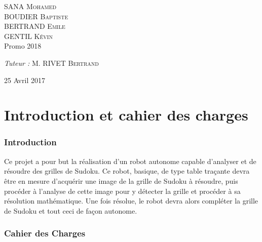 \documentclass[12pt]{article}
\begin{document}
\begin{titlepage}
\begin{sffamily}
\begin{center}
    \begin{minipage}{0.4\textwidth}
      \begin{flushleft} \large
        \textsc{SANA Mohamed}\\
        \textsc{BOUDIER Baptiste}\\
        \textsc{BERTRAND Emile}\\
        \textsc{GENTIL Kévin}\\
        Promo 2018\\
      \end{flushleft}
    \end{minipage}
    \begin{minipage}{0.4\textwidth}
      \begin{flushright} \large
        \emph{Tuteur :} M. \textsc{RIVET Bertrand}\\
      \end{flushright}
    \end{minipage}

    \vfill

    {\large 25 Avril 2017}

  \end{center}
  \end{sffamily}
\end{titlepage}
\vspace*{3cm}

\tableofcontents
\newpage
\part{Introduction et cahier des charges}

\section{Introduction}
Ce projet a pour but la réalisation d'un robot autonome capable d'analyser et de résoudre des grilles de Sudoku. Ce robot, basique, de type table traçante devra être en mesure d'acquérir une image de la grille de Sudoku à résoudre, puis procéder à l'analyse de cette image pour y détecter la grille et procéder à sa résolution mathématique. Une fois résolue, le robot devra alors  compléter la grille de Sudoku et tout ceci de façon autonome.  

\section{Cahier des Charges}
\end{document}
